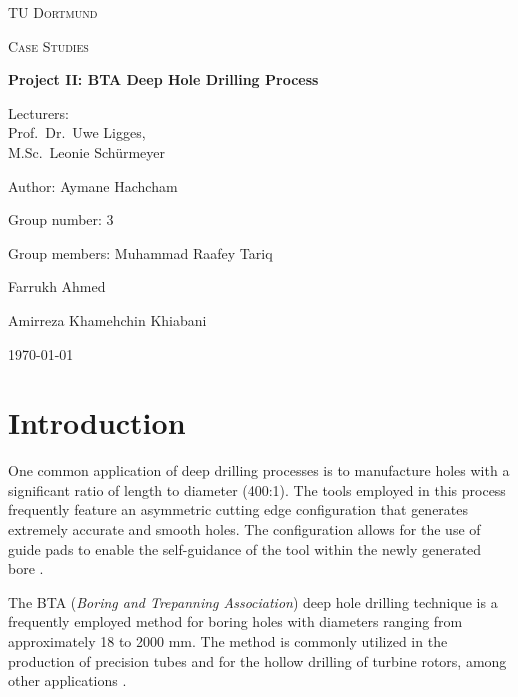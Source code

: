 \documentclass[12 pt]{scrartcl}
\numberwithin{equation}{section}
\begin{document}
\begin{titlepage}
	\centering
	{\scshape\LARGE TU Dortmund \par}
	\vspace{1cm}
	{\scshape\Large Case Studies \par}
	\vspace{1cm}
	{\huge\bfseries Project II: BTA Deep Hole Drilling Process\par}
	\vspace{2cm}
	{\Large Lecturers:\\
		Prof.\ Dr.\ Uwe Ligges,\\
		M.Sc.\ Leonie Schürmeyer \\
        \par}

	\vspace{1cm}
	{\Large Author: Aymane Hachcham \par}
	\vspace{0.5 cm}
	{\Large Group number: 3 \par}
	\vspace{0.5 cm}
	{\Large Group members: Muhammad Raafey Tariq \par Farrukh Ahmed \par Amirreza Khamehchin Khiabani}
	\vfill
	{\large \today\par}
\end{titlepage}


\tableofcontents

\cleardoublepage
{}

\section{Introduction}
\label{sec:Introduction}

One common application of deep drilling processes is to manufacture holes with a significant ratio of length to diameter 
(400:1). 
The tools employed in this process frequently feature an asymmetric cutting edge configuration
that generates extremely accurate and smooth holes.
The configuration allows for the use of guide pads to enable 
the self-guidance of the tool within the newly generated bore \citep{haddag2013study}.

The BTA (\textit{Boring and Trepanning Association}) deep hole drilling technique 
is a frequently employed method for boring holes with diameters ranging from approximately 18 to 2000 mm.
The method is commonly utilized in the production of precision tubes and for the hollow drilling of turbine rotors, among other applications \citep{webber2006investigations}. 
\end{document}
